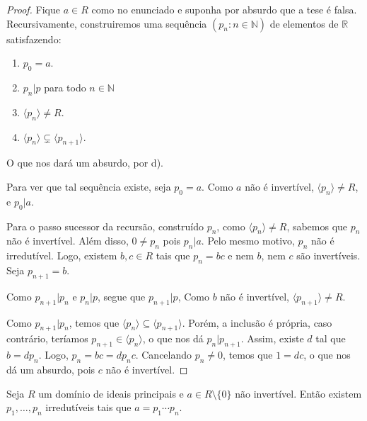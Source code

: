 \begin{proof}
    Fique $a \in R$ como no enunciado e suponha por absurdo que a tese é falsa.
    Recursivamente, construiremos uma sequência $(p_n: n \in \mathbb N)$ de elementos de $\mathbb R$ satisfazendo:
    \begin{enumerate}[label=\alph*)]
        \item $p_0=a$.
        \item $p_n|p$ para todo $n \in \mathbb N$
        \item $\langle p_n\rangle\neq R$.
        \item $\langle p_n\rangle\subsetneq \langle p_{n+1}\rangle$.
    \end{enumerate}
    O que nos dará um absurdo, por d).

    Para ver que tal sequência existe, seja $p_0=a$. Como $a$ não é invertível, $\langle p_n\rangle \neq R$, e $p_0|a$.

    Para o passo sucessor da recursão, construído $p_n$, como $\langle p_n\rangle\neq R$, sabemos que $p_n$ não é invertível.
    Além disso, $0\neq p_n$ pois $p_n|a$.
    Pelo mesmo motivo, $p_n$ não é irredutível.
    Logo, existem $b, c \in R$ tais que $p_n=bc$ e nem $b$, nem $c$ são invertíveis.
    Seja $p_{n+1}=b$.

    Como $p_{n+1}|p_n$ e $p_n|p$, segue que $p_{n+1}|p$,
    Como $b$ não é invertível, $\langle p_{n+1}\rangle\neq R$.

    Como $p_{n+1}|p_n$, temos que $\langle p_n\rangle\subseteq \langle p_{n+1}\rangle$.
    Porém, a inclusão é própria, caso contrário, teríamos $p_{n+1}\in \langle p_n\rangle$, o que nos dá $p_n|p_{n+1}$.
    Assim, existe $d$ tal que $b=dp_n$.
    Logo, $p_n=bc=dp_nc$.
    Cancelando $p_n\neq 0$, temos que $1=dc$, o que nos dá um absurdo, pois $c$ não é invertível.
\end{proof}

\begin{lemma}
    Seja $R$ um domínio de ideais principais e $a\in R\setminus \{0\}$ não invertível.
    Então existem $p_1, \dots, p_n$ irredutíveis tais que $a=p_1\cdots p_n$.
\end{lemma}

